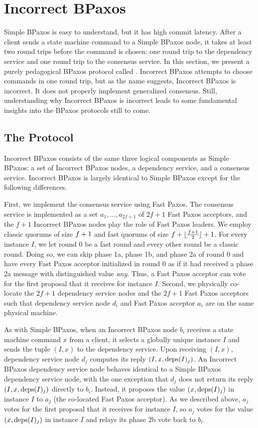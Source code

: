 \section{Incorrect BPaxos}
Simple BPaxos is easy to understand, but it has high commit latency. After a
client sends a state machine command to a Simple BPaxos node, it takes at least
two round trips before the command is chosen: one round trip to the
dependency service and one round trip to the consensus service. In this
section, we present a purely pedagogical BPaxos protocol called
. Incorrect BPaxos attempts to choose commands in
one round trip, but as the name suggests, Incorrect BPaxos is incorrect. It
does not properly implement generalized consensus. Still, understanding why
Incorrect BPaxos is incorrect leads to some fundamental insights into the
BPaxos protocols still to come.

\subsection{The Protocol}
Incorrect BPaxos consists of the same three logical components as Simple
BPaxos: a set of Incorrect BPaxos nodes, a dependency service, and a consensus
service. Incorrect BPaxos is largely identical to Simple BPaxos except for the
following differences.

First, we implement the consensus service using Fast Paxos. The consensus
service is implemented as a set $a_1, \ldots, a_{2f + 1}$ of $2f + 1$ Fast
Paxos acceptors, and the $f + 1$ Incorrect BPaxos nodes play the role of Fast
Paxos leaders. We employ classic quorums of size $f + 1$ and fast quorums
of size $f + \lfloor\frac{f + 1}{2}\rfloor + 1$. For every instance $I$, we let round $0$ be a fast
round and every other round be a classic round. Doing so, we can skip phase 1a,
phase 1b, and phase 2a of round $0$ and have every Fast Paxos acceptor
initialized in round $0$ as if it had received a phase 2a message with
distinguished value \emph{any}. Thus, a Fast Paxos acceptor can vote for the
first proposal that it receives for instance $I$.
%
Second, we physically co-locate the $2f + 1$ dependency service nodes and the
$2f + 1$ Fast Paxos acceptors such that dependency service node $d_i$ and Fast
Paxos acceptor $a_i$ are on the same physical machine.

As with Simple BPaxos, when an Incorrect BPaxos node $b_i$ receives a state
machine command $x$ from a client, it selects a globally unique instance $I$
and sends the tuple $(I, x)$ to the dependency service. Upon receiving $(I,
x)$, dependency service node $d_j$ computes its reply $(I, x, \text{deps}(I)_j)$.  An
Incorrect BPaxos dependency service node behaves identical to a Simple BPaxos
dependency service node, with the one exception that $d_j$ does not return its
reply $(I, x, \text{deps}(I)_j)$ directly to $b_i$. Instead, it proposes the value
$(x, \text{deps}(I)_j)$ in instance $I$ to $a_j$ (the co-located Fast Paxos
acceptor). As we described above, $a_j$ votes for the first proposal that it
receives for instance $I$, so $a_j$ votes for the value $(x, \text{deps}(I)_j)$ in
instance $I$ and relays its phase 2b vote back to $b_i$.

